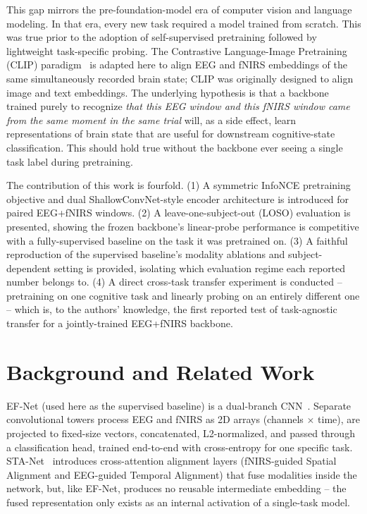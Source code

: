 \documentclass[journal]{IEEEtran}
\begin{document}
This gap mirrors the pre-foundation-model era of computer vision and language modeling. In that era, every new task required a model trained from scratch. This was true prior to the adoption of self-supervised pretraining followed by lightweight task-specific probing. The Contrastive Language-Image Pretraining (CLIP) paradigm~\cite{radford2021} is adapted here to align EEG and fNIRS embeddings of the same simultaneously recorded brain state; CLIP was originally designed to align image and text embeddings. The underlying hypothesis is that a backbone trained purely to recognize \emph{that this EEG window and this fNIRS window came from the same moment in the same trial} will, as a side effect, learn representations of brain state that are useful for downstream cognitive-state classification. This should hold true without the backbone ever seeing a single task label during pretraining.

The contribution of this work is fourfold. (1) A symmetric InfoNCE pretraining objective and dual ShallowConvNet-style encoder architecture is introduced for paired EEG+fNIRS windows. (2) A leave-one-subject-out (LOSO) evaluation is presented, showing the frozen backbone's linear-probe performance is competitive with a fully-supervised baseline on the task it was pretrained on. (3) A faithful reproduction of the supervised baseline's modality ablations and subject-dependent setting is provided, isolating which evaluation regime each reported number belongs to. (4) A direct cross-task transfer experiment is conducted -- pretraining on one cognitive task and linearly probing on an entirely different one -- which is, to the authors' knowledge, the first reported test of task-agnostic transfer for a jointly-trained EEG+fNIRS backbone.

\section{Background and Related Work}
EF-Net (used here as the supervised baseline) is a dual-branch CNN~\cite{arif2024}. Separate convolutional towers process EEG and fNIRS as 2D arrays (channels $\times$ time), are projected to fixed-size vectors, concatenated, L2-normalized, and passed through a classification head, trained end-to-end with cross-entropy for one specific task. STA-Net~\cite{liu2025} introduces cross-attention alignment layers (fNIRS-guided Spatial Alignment and EEG-guided Temporal Alignment) that fuse modalities inside the network, but, like EF-Net, produces no reusable intermediate embedding -- the fused representation only exists as an internal activation of a single-task model.
\end{document}
